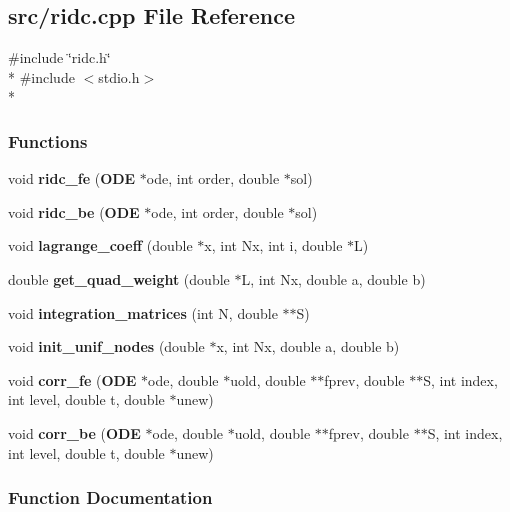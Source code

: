 \subsection{src/ridc.cpp File Reference}
\label{ridc_8cpp}
{\ttfamily \#include \char`\"{}ridc.\+h\char`\"{}}\\*
{\ttfamily \#include $<$stdio.\+h$>$}\\*
\subsubsection*{Functions}
\begin{DoxyCompactItemize}
\item 
void {\bf ridc\+\_\+fe} ({\bf O\+D\+E} $\ast$ode, int order, double $\ast$sol)
\item 
void {\bf ridc\+\_\+be} ({\bf O\+D\+E} $\ast$ode, int order, double $\ast$sol)
\item 
void {\bf lagrange\+\_\+coeff} (double $\ast$x, int Nx, int i, double $\ast$L)
\item 
double {\bf get\+\_\+quad\+\_\+weight} (double $\ast$L, int Nx, double a, double b)
\item 
void {\bf integration\+\_\+matrices} (int N, double $\ast$$\ast$S)
\item 
void {\bf init\+\_\+unif\+\_\+nodes} (double $\ast$x, int Nx, double a, double b)
\item 
void {\bf corr\+\_\+fe} ({\bf O\+D\+E} $\ast$ode, double $\ast$uold, double $\ast$$\ast$fprev, double $\ast$$\ast$S, int index, int level, double t, double $\ast$unew)
\item 
void {\bf corr\+\_\+be} ({\bf O\+D\+E} $\ast$ode, double $\ast$uold, double $\ast$$\ast$fprev, double $\ast$$\ast$S, int index, int level, double t, double $\ast$unew)
\end{DoxyCompactItemize}


\subsubsection{Function Documentation}
